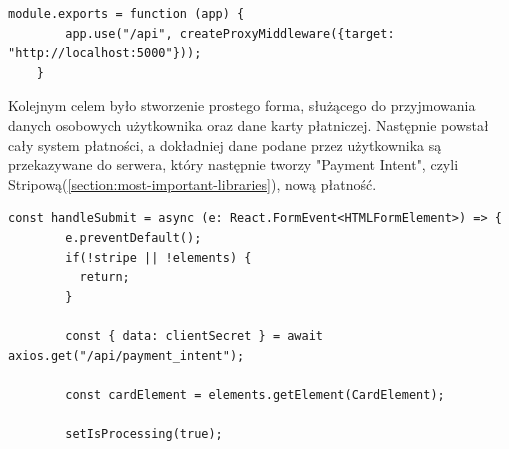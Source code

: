 \documentclass[12pt]{article}
\begin{document}
\begin{sloppypar}
{\begin{lstlisting}[caption=Proxy Middleware do połączenia strony frontendowej z backendową., captionpos=b]
    module.exports = function (app) {
        app.use("/api", createProxyMiddleware({target: "http://localhost:5000"}));
    } 
  \end{lstlisting}
  Kolejnym celem było stworzenie prostego forma, służącego do przyjmowania danych osobowych użytkownika oraz dane karty płatniczej. Następnie powstał cały system płatności, 
  a dokładniej dane podane przez użytkownika są przekazywane do serwera, który następnie tworzy "Payment Intent", czyli Stripową(\ref{section:most-important-libraries}), 
  nową płatność.
  \begin{lstlisting}[caption=Obsługa przekazywania danych klienta na serwer w celu dokonania nowej płatności., captionpos=b]
      const handleSubmit = async (e: React.FormEvent<HTMLFormElement>) => {
        e.preventDefault();
        if(!stripe || !elements) {
          return;
        }

        const { data: clientSecret } = await axios.get("/api/payment_intent");

        const cardElement = elements.getElement(CardElement);
        
        setIsProcessing(true);
        

\end{lstlisting}}
\end{sloppypar}
\end{document}
